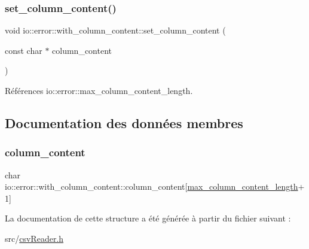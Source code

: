 \subsubsection{\texorpdfstring{set\+\_\+column\+\_\+content()}{set\_column\_content()}}
{\footnotesize\ttfamily void io\+::error\+::with\+\_\+column\+\_\+content\+::set\+\_\+column\+\_\+content (\begin{DoxyParamCaption}\item[{const char $\ast$}]{column\+\_\+content }\end{DoxyParamCaption})\hspace{0.3cm}{\ttfamily [inline]}}



Références io\+::error\+::max\+\_\+column\+\_\+content\+\_\+length.



\subsection{Documentation des données membres}
\mbox{\label{structio_1_1error_1_1with__column__content_a8587779769fbfb40155abb362137a523}} 
\subsubsection{\texorpdfstring{column\+\_\+content}{column\_content}}
{\footnotesize\ttfamily char io\+::error\+::with\+\_\+column\+\_\+content\+::column\+\_\+content\mbox{[}\hyperlink{namespaceio_1_1error_a5a641f4f0837f4c94416e05461a62749}{max\+\_\+column\+\_\+content\+\_\+length}+1\mbox{]}}



La documentation de cette structure a été générée à partir du fichier suivant \+:\begin{DoxyCompactItemize}
\item 
src/\hyperlink{csvReader_8h}{csv\+Reader.\+h}\end{DoxyCompactItemize}
